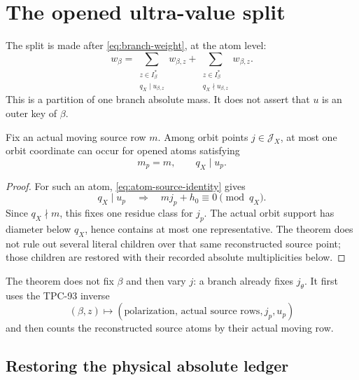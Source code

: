 \section{The opened ultra-value split}
\label{sec:ultra-split}

The split is made after \eqref{eq:branch-weight}, at the atom level:
\begin{equation}
 w_\beta
 =
 \sum_{\substack{z\in I_\beta^\ast\\q_X\mid u_{\beta,z}}}
 w_{\beta,z}
 +
 \sum_{\substack{z\in I_\beta^\ast\\q_X\nmid u_{\beta,z}}}
 w_{\beta,z}.
\label{eq:atom-ultra-split}
\end{equation}
This is a partition of one branch absolute mass.  It does not assert
that \(u\) is an outer key of \(\beta\).

\begin{theorem}
\label{thm:atom-q-u-one-point}
Fix an actual moving source row \(m\).  Among orbit points
\(j\in\mathcal J_X\), at most one orbit coordinate can occur for
opened atoms satisfying
\[
 m_p=m,\qquad q_X\mid u_p.
\]
\end{theorem}

\begin{proof}
For such an atom, \eqref{eq:atom-source-identity} gives
\[
 q_X\mid u_p
 \quad\Longrightarrow\quad
 mj_p+h_0\equiv0\pmod{q_X}.
\]
Since \(q_X\nmid m\), this fixes one residue class for \(j_p\).
The actual orbit support has diameter below \(q_X\), hence contains
at most one representative.  The theorem does not rule out several
literal children over that same reconstructed source point; those
children are restored with their recorded absolute multiplicities
below.
\end{proof}

\begin{remark}
The theorem does not fix \(\beta\) and then vary \(j\): a branch
already fixes \(j_\theta\).  It first uses the TPC-93 inverse
\[
 (\beta,z)\longmapsto
 (\text{polarization, actual source rows},j_p,u_p)
\]
and then counts the reconstructed source atoms by their actual
moving row.
\end{remark}

\subsection{Restoring the physical absolute ledger}

